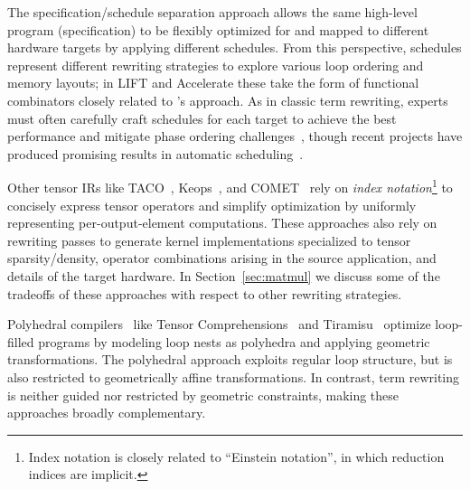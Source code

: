 The specification/schedule separation approach
  allows the same high-level program (specification)
  to be flexibly optimized for and mapped to
  different hardware targets by applying different schedules.
From this perspective,
  schedules represent different rewriting strategies
  to explore various loop ordering and memory layouts;
  in LIFT and Accelerate these
  take the form of functional combinators
  closely related to \g's approach.
As in classic term rewriting,
  experts must often carefully craft
  schedules for each target to achieve
  the best performance and mitigate
  phase ordering challenges~\cite{phase-ordering},
  though recent projects have produced promising results
  in automatic scheduling~\cite{
    chen2018autotvm, zheng2020ansor, anderson2020learning}.

Other tensor IRs like
  TACO~\cite{taco}, Keops~\cite{keops},
  and COMET~\cite{tian2021highperformance}
  rely on \textit{index notation}\footnote{
    Index notation is closely related to
    ``Einstein notation'', in which reduction
    indices are implicit.}
  to concisely express tensor operators
  and simplify optimization by
  uniformly representing
  per-output-element computations.
These approaches also rely on
  rewriting passes to generate
  kernel implementations specialized to
  tensor sparsity/density,
  operator combinations arising in
  the source application, and
  details of the target hardware.
In Section~\ref{sec:matmul} we discuss
  some of the tradeoffs of these approaches
  with respect to other rewriting strategies.
 
Polyhedral compilers~\cite{polyhedral-survey}
  like Tensor Comprehensions~\cite{vasilache2018tensor}
  and Tiramisu~\cite{tiramisu}
  optimize loop-filled programs
  by modeling loop nests as polyhedra
  and applying geometric transformations.
The polyhedral approach exploits
  regular loop structure,
  but is also restricted
  to geometrically affine transformations.
In contrast, term rewriting is
  neither guided nor restricted by
  geometric constraints, making
  these approaches broadly complementary.



